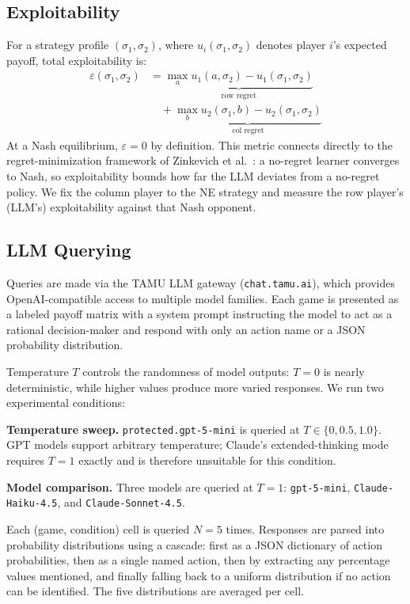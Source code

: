 \documentclass[10pt,twocolumn]{article}
\begin{document}
\subsection{Exploitability}

For a strategy profile $(\sigma_1, \sigma_2)$, where $u_i(\sigma_1, \sigma_2)$
denotes player $i$'s expected payoff, total exploitability is:
\begin{align}
  \varepsilon(\sigma_1, \sigma_2)
    &= \underbrace{\max_a u_1(a,\sigma_2) - u_1(\sigma_1,\sigma_2)}_{\text{row regret}}
    \nonumber \\
    &\quad + \underbrace{\max_b u_2(\sigma_1,b) - u_2(\sigma_1,\sigma_2)}_{\text{col regret}}
  \label{eq:exploit}
\end{align}
At a Nash equilibrium, $\varepsilon = 0$ by definition.
This metric connects directly to the regret-minimization framework of
Zinkevich et al.~\cite{zinkevich2007}: a no-regret learner converges to Nash, so
exploitability bounds how far the LLM deviates from a no-regret policy.
We fix the column player to the NE strategy and measure the row player's (LLM's)
exploitability against that Nash opponent.

\subsection{LLM Querying}

Queries are made via the TAMU LLM gateway (\texttt{chat.tamu.ai}), which provides
OpenAI-compatible access to multiple model families.
Each game is presented as a labeled payoff matrix with a system prompt instructing
the model to act as a rational decision-maker and respond with only an action name
or a JSON probability distribution.

Temperature $T$ controls the randomness of model outputs: $T{=}0$ is nearly
deterministic, while higher values produce more varied responses.
We run two experimental conditions:

\textbf{Temperature sweep.} \texttt{protected.gpt-5-mini} is queried at
$T \in \{0, 0.5, 1.0\}$.
GPT models support arbitrary temperature; Claude's extended-thinking mode requires
$T = 1$ exactly and is therefore unsuitable for this condition.

\textbf{Model comparison.} Three models are queried at $T = 1$:
\texttt{gpt-5-mini}, \texttt{Claude-Haiku-4.5}, and \texttt{Claude-Sonnet-4.5}.

Each (game, condition) cell is queried $N = 5$ times.
Responses are parsed into probability distributions using a cascade: first as a
JSON dictionary of action probabilities, then as a single named action, then by
extracting any percentage values mentioned, and finally falling back to a uniform
distribution if no action can be identified.
The five distributions are averaged per cell.
\end{document}
